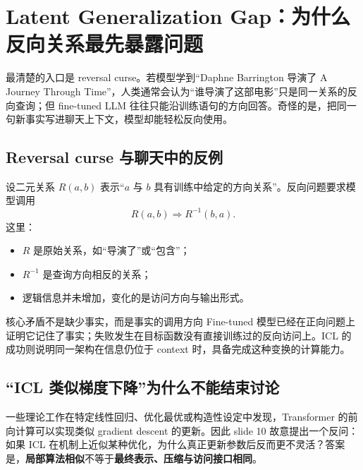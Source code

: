 \section{Latent Generalization Gap：为什么反向关系最先暴露问题}

最清楚的入口是 reversal curse。若模型学到“Daphne Barrington 导演了 A Journey Through Time”，人类通常会认为“谁导演了这部电影”只是同一关系的反向查询；但 fine-tuned LLM 往往只能沿训练语句的方向回答。奇怪的是，把同一句新事实写进聊天上下文，模型却能轻松反向使用。

\subsection{Reversal curse 与聊天中的反例}

设二元关系 $R(a,b)$ 表示“$a$ 与 $b$ 具有训练中给定的方向关系”。反向问题要求模型调用
$$
R(a,b)\Longrightarrow R^{-1}(b,a).
$$
这里：
\begin{itemize}
  \item $R$ 是原始关系，如“导演了”或“包含”；
  \item $R^{-1}$ 是查询方向相反的关系；
  \item 逻辑信息并未增加，变化的是访问方向与输出形式。
\end{itemize}




\begin{importantbox}{核心矛盾不是缺少事实，而是事实的调用方向}
Fine-tuned 模型已经在正向问题上证明它记住了事实；失败发生在目标函数没有直接训练过的反向访问上。ICL 的成功则说明同一架构在信息仍位于 context 时，具备完成这种变换的计算能力。
\end{importantbox}

\subsection{“ICL 类似梯度下降”为什么不能结束讨论}

一些理论工作在特定线性回归、优化最优或构造性设定中发现，Transformer 的前向计算可以实现类似 gradient descent 的更新。因此 slide 10 故意提出一个反问：如果 ICL 在机制上近似某种优化，为什么真正更新参数后反而更不灵活？答案是，\textbf{局部算法相似}不等于\textbf{最终表示、压缩与访问接口相同}。

